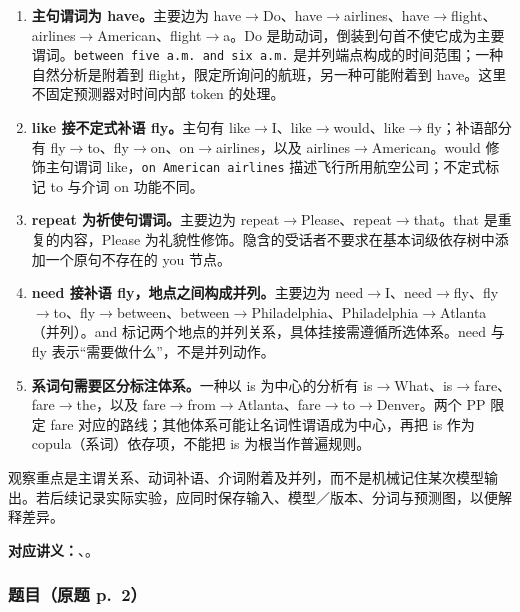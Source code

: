 \begin{checkedsolution}
\begin{enumerate}[label=\alph*)]
  \item \textbf{主句谓词为 have。}主要边为 have$\rightarrow$Do、have$\rightarrow$airlines、have$\rightarrow$flight、airlines$\rightarrow$American、flight$\rightarrow$a。Do 是助动词，倒装到句首不使它成为主要谓词。\texttt{between five a.m. and six a.m.} 是并列端点构成的时间范围；一种自然分析是附着到 flight，限定所询问的航班，另一种可能附着到 have。这里不固定预测器对时间内部 token 的处理。
  \item \textbf{like 接不定式补语 fly。}主句有 like$\rightarrow$I、like$\rightarrow$would、like$\rightarrow$fly；补语部分有 fly$\rightarrow$to、fly$\rightarrow$on、on$\rightarrow$airlines，以及 airlines$\rightarrow$American。would 修饰主句谓词 like，\texttt{on American airlines} 描述飞行所用航空公司；不定式标记 to 与介词 on 功能不同。
  \item \textbf{repeat 为祈使句谓词。}主要边为 repeat$\rightarrow$Please、repeat$\rightarrow$that。that 是重复的内容，Please 为礼貌性修饰。隐含的受话者不要求在基本词级依存树中添加一个原句不存在的 you 节点。
  \item \textbf{need 接补语 fly，地点之间构成并列。}主要边为 need$\rightarrow$I、need$\rightarrow$fly、fly$\rightarrow$to、fly$\rightarrow$between、between$\rightarrow$Philadelphia、Philadelphia$\rightarrow$Atlanta（并列）。and 标记两个地点的并列关系，具体挂接需遵循所选体系。need 与 fly 表示“需要做什么”，不是并列动作。
  \item \textbf{系词句需要区分标注体系。}一种以 is 为中心的分析有 is$\rightarrow$What、is$\rightarrow$fare、fare$\rightarrow$the，以及 fare$\rightarrow$from$\rightarrow$Atlanta、fare$\rightarrow$to$\rightarrow$Denver。两个 PP 限定 fare 对应的路线；其他体系可能让名词性谓语成为中心，再把 is 作为 copula（系词）依存项，不能把 is 为根当作普遍规则。
\end{enumerate}
观察重点是主谓关系、动词补语、介词附着及并列，而不是机械记住某次模型输出。若后续记录实际实验，应同时保存输入、模型／版本、分词与预测图，以便解释差异。
\end{checkedsolution}


\textbf{对应讲义：}、。

\subsubsection*{题目（原题 p.~2）}

